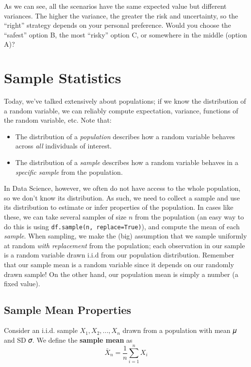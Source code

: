\documentclass[
  letterpaper,
  DIV=11,
  numbers=noendperiod]{scrreprt}
\providecommand{\tightlist}{%
  \setlength{\itemsep}{0pt}\setlength{\parskip}{0pt}}\usepackage{longtable,booktabs,array}
\begin{document}
\begin{tcolorbox}
As we can see, all the scenarios have the same expected value but
different variances. The higher the variance, the greater the risk and
uncertainty, so the ``right'' strategy depends on your personal
preference. Would you choose the ``safest'' option B, the most ``risky''
option C, or somewhere in the middle (option A)?

\end{tcolorbox}

\section{Sample Statistics}\label{sample-statistics}

Today, we've talked extensively about populations; if we know the
distribution of a random variable, we can reliably compute expectation,
variance, functions of the random variable, etc. Note that:

\begin{itemize}
\tightlist
\item
  The distribution of a \emph{population} describes how a random
  variable behaves across \emph{all} individuals of interest.
\item
  The distribution of a \emph{sample} describes how a random variable
  behaves in a \emph{specific sample} from the population.
\end{itemize}

In Data Science, however, we often do not have access to the whole
population, so we don't know its distribution. As such, we need to
collect a sample and use its distribution to estimate or infer
properties of the population. In cases like these, we can take several
samples of size \(n\) from the population (an easy way to do this is
using \texttt{df.sample(n,\ replace=True)}), and compute the mean of
each \emph{sample}. When sampling, we make the (big) assumption that we
sample uniformly at random \emph{with replacement} from the population;
each observation in our sample is a random variable drawn i.i.d from our
population distribution. Remember that our sample mean is a random
variable since it depends on our randomly drawn sample! On the other
hand, our population mean is simply a number (a fixed value).

\subsection{Sample Mean Properties}\label{sample-mean-properties}

Consider an i.i.d. sample \(X_1, X_2, ..., X_n\) drawn from a population
with mean 𝜇 and SD 𝜎. We define the \textbf{sample mean} as
\[\bar{X}_n = \frac{1}{n} \sum_{i=1}^n X_i\]
\end{document}
